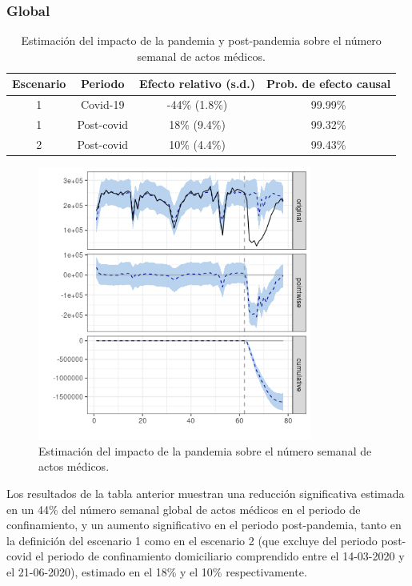 \documentclass[12pt,twoside]{article} %
\begin{document}
\subsubsection{Global}\label{global}
\begin{table}[H]\caption{Estimación del impacto de la pandemia y post-pandemia sobre el número semanal de actos médicos.}
    \centering  
      \begin{tabular}{ |c|c|c|c| }
          \hline
          \textbf{Escenario} & \textbf{Periodo} & \textbf{Efecto relativo (s.d.)} & \textbf{Prob. de efecto causal} \\ 
          \hline
       1 & Covid-19 & -44\% (1.8\%) & 99.99\% \\  
       1 & Post-covid & 18\% (9.4\%) & 99.32\% \\
       \hline   
       2 & Post-covid & 10\% (4.4\%) & 99.43\% \\
       \hline
      \end{tabular}
  \end{table}
  
  \begin{center}
      \begin{figure}[H]
        \includegraphics[width=9cm]{global_covid.png}\caption{Estimación del impacto de la pandemia sobre el número semanal de actos médicos.}
      \end{figure}\label{global_covid}
      \end{center}

Los resultados de la tabla anterior muestran una reducción significativa estimada en un 44\% del número semanal global de actos médicos en el periodo de confinamiento, y un aumento significativo en el periodo post-pandemia, tanto en la definición del escenario 1 como en el escenario 2 (que excluye del periodo post-covid el periodo de confinamiento domiciliario comprendido entre el 14-03-2020 y el 21-06-2020), estimado en el 18\% y el 10\% respectivamente.
      
\end{document}
